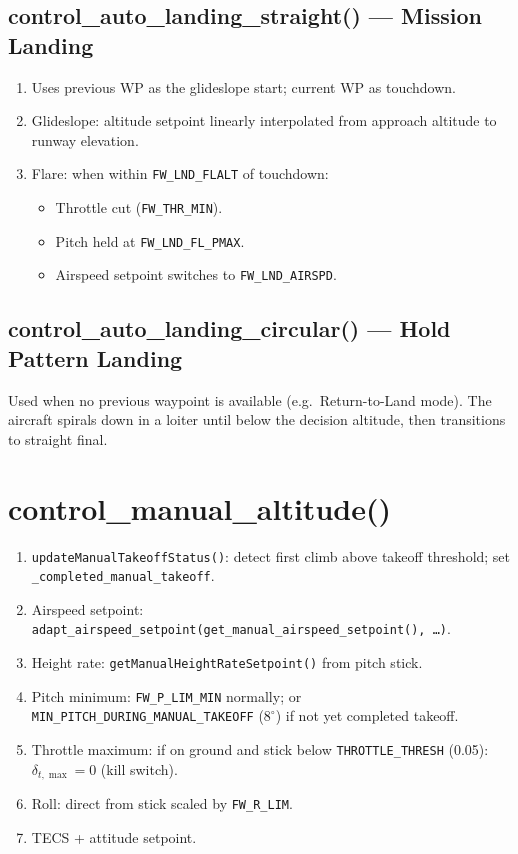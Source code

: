 \documentclass[12pt,a4paper]{article}
\begin{document}
\subsection{control\_auto\_landing\_straight() --- Mission Landing}

\begin{enumerate}
  \item Uses previous WP as the glideslope start; current WP as
        touchdown.
  \item Glideslope: altitude setpoint linearly interpolated from approach
        altitude to runway elevation.
  \item Flare: when within \texttt{FW\_LND\_FLALT} of touchdown:
        \begin{itemize}
          \item Throttle cut (\texttt{FW\_THR\_MIN}).
          \item Pitch held at \texttt{FW\_LND\_FL\_PMAX}.
          \item Airspeed setpoint switches to \texttt{FW\_LND\_AIRSPD}.
        \end{itemize}
\end{enumerate}

\subsection{control\_auto\_landing\_circular() --- Hold Pattern Landing}

Used when no previous waypoint is available (e.g.\ Return-to-Land mode).
The aircraft spirals down in a loiter until below the decision altitude,
then transitions to straight final.

\section{control\_manual\_altitude()}

\begin{enumerate}
  \item \texttt{updateManualTakeoffStatus()}: detect first climb above
        takeoff threshold; set \texttt{\_completed\_manual\_takeoff}.
  \item Airspeed setpoint: \texttt{adapt\_airspeed\_setpoint(get\_manual\_airspeed\_setpoint(), \ldots)}.
  \item Height rate: \texttt{getManualHeightRateSetpoint()} from pitch stick.
  \item Pitch minimum: \texttt{FW\_P\_LIM\_MIN} normally; or
        \texttt{MIN\_PITCH\_DURING\_MANUAL\_TAKEOFF} ($8^\circ$) if
        not yet completed takeoff.
  \item Throttle maximum: if on ground and stick below
        \texttt{THROTTLE\_THRESH} (0.05): $\delta_{t,\max} = 0$ (kill switch).
  \item Roll: direct from stick scaled by \texttt{FW\_R\_LIM}.
  \item TECS + attitude setpoint.
\end{enumerate}
\end{document}
